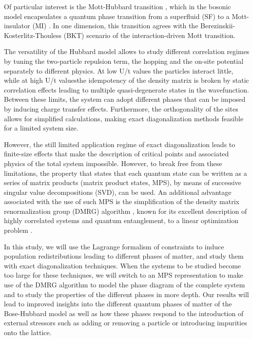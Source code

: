 \documentclass[twoside,twocolumn,9pt]{article}
\begin{document}
Of particular interest is the Mott-Hubbard transition \cite{mott1949}, which in the bosonic model encapsulates a quantum phase transition from a superfluid (SF) to a Mott-insulator (MI) \cite{elstner1999, capello2007, cucchietti2007}. In one dimension, this transition agrees with the Berezinskii-Kosterlitz-Thouless (BKT) \cite{kosterlitz1973} scenario of the interaction-driven Mott transition.

The versatility of the Hubbard model allows to study different correlation regimes by tuning the two-particle repulsion term, the hopping and the on-site potential separately to different physics. At low U/t values ​​the particles interact little, while at high U/t values ​​the idempotency of the density matrix is ​​broken by static correlation effects leading to multiple quasi-degenerate states in the wavefunction\cite{fabrizio1999, batista2004, scalettar2016, walsh2019a, walsh2019b}. Between these limits, the system can adopt different phases that can be imposed by inducing charge transfer effects. Furthermore, the orthogonality of the sites allows for simplified calculations, making exact diagonalization \cite{zhang2010} methods feasible for a limited system size.

However, the still limited application regime of exact diagonalization leads to finite-size effects that make the description of critical points and associated physics of the total system impossible. However, to break free from these limitations, the property that states that each quantum state can be written as a series of matrix products (matrix product states, MPS)\cite{perez2006}, by means of successive singular value decompositions (SVD), can be used. An additional advantage associated with the use of such MPS is the simplification of the density matrix renormalization group (DMRG) algorithm \cite{white1993}, known for its excellent description of highly correlated systems and quantum entanglement, to a linear optimization problem \cite{schollwock2011a, schollwock2011b, verstraete2023}.

In this study, we will use the Lagrange formalism of constraints \cite{mukherji1963} to induce population redistributions leading to different phases of matter, and study them with exact diagonalization techniques. When the systems to be studied become too large for these techniques, we will switch to an MPS representation to make use of the DMRG algorithm to model the phase diagram of the complete system and to study the properties of the different phases in more depth. Our results will lead to improved insights into the different quantum phases of matter of the Bose-Hubbard model as well as how these phases respond to the introduction of external stressors such as adding or removing a particle or introducing impurities onto the lattice.
\end{document}
